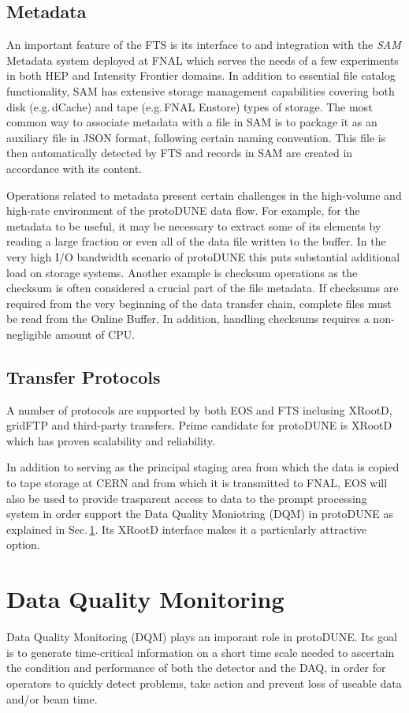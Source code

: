 \documentclass[a4paper]{jpconf}
\newcommand{\pd}{protoDUNE\xspace}
\begin{document}
\subsection{Metadata}
An important feature of the FTS is its interface to and integration with 
the \textit{SAM} Metadata system deployed at FNAL which serves the needs of a few
experiments in both HEP and Intensity Frontier domains. In addition to essential file catalog
functionality, SAM has extensive storage management
capabilities covering both disk (e.g.\,dCache) and tape (e.g.\,FNAL Enstore) types of storage.
The most common way
to associate metadata with a file in SAM is to package it as an auxiliary file in JSON format,
following certain naming convention. This file is then automatically detected by FTS
and records in SAM are created in accordance with its content.

Operations related to metadata present certain challenges in the high-volume and high-rate
environment of the \pd data flow. For example, for the metadata to be useful, it may
be necessary to extract some of its elements by reading a large fraction or even all of the data file
written to the buffer. In the very high I/O bandwidth scenario of \pd this puts substantial additional
load on storage systems. Another example is checksum operations as the checksum is often
considered a crucial part of the file metadata. If checksums are required from the very beginning
of the data transfer chain, complete files must be read from the Online Buffer. In addition, handling
checksums requires a non-negligible amount of CPU.

\subsection{Transfer Protocols}
A number of protocols are supported by both EOS and FTS inclusing XRootD, gridFTP
and third-party transfers. Prime candidate for \pd is XRootD which has proven scalability
and reliability.

In addition to serving as the principal staging area from which the data is copied to
tape storage at CERN and from which it is transmitted to FNAL, 
EOS will also be used to provide trasparent access to data to the prompt processing system
in order support the Data Quality Moniotring (DQM) in \pd as explained in Sec.\,\ref{sec:dqm}.
Its XRootD interface makes it a particularly attractive option.

\section{Data Quality Monitoring}
\label{sec:dqm}
Data Quality Monitoring (DQM) plays an imporant role in \pd.
Its goal is to generate time-critical information on a short time
scale needed to ascertain the condition
and performance of both the detector and the DAQ,
in order for operators to quickly detect problems, take action and prevent loss
of useable data and/or beam time.
\end{document}
